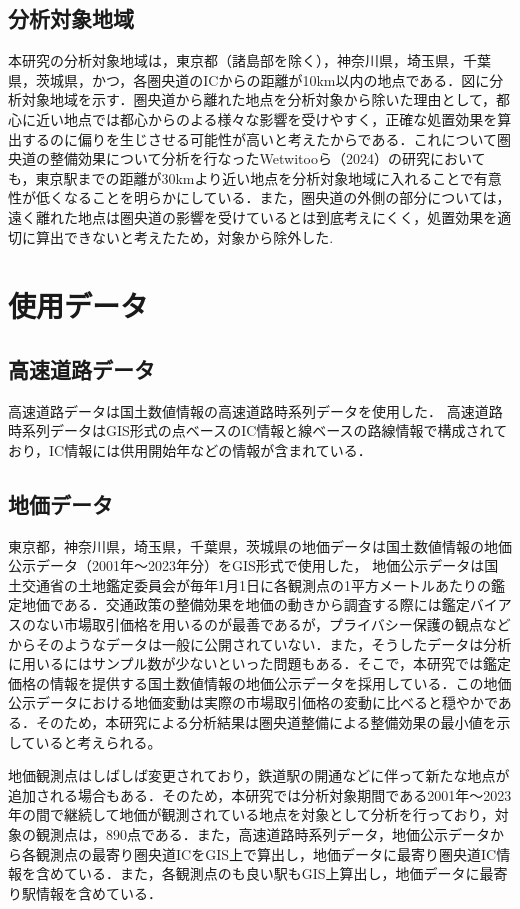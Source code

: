 \subsection{分析対象地域}
本研究の分析対象地域は，東京都（諸島部を除く），神奈川県，埼玉県，千葉県，茨城県，かつ，各圏央道のICからの距離が10km以内の地点である．図に分析対象地域を示す．圏央道から離れた地点を分析対象から除いた理由として，都心に近い地点では都心からのよる様々な影響を受けやすく，正確な処置効果を算出するのに偏りを生じさせる可能性が高いと考えたからである．これについて圏央道の整備効果について分析を行なったWetwitooら（2024）\cite{Weteitoo2024}の研究においても，東京駅までの距離が30kmより近い地点を分析対象地域に入れることで有意性が低くなることを明らかにしている．また，圏央道の外側の部分については，遠く離れた地点は圏央道の影響を受けているとは到底考えにくく，処置効果を適切に算出できないと考えたため，対象から除外した.

\section{使用データ}

\subsection{高速道路データ}
高速道路データは国土数値情報の高速道路時系列データを使用した．
高速道路時系列データはGIS形式の点ベースのIC情報と線ベースの路線情報で構成されており，IC情報には供用開始年などの情報が含まれている．

\subsection{地価データ}
東京都，神奈川県，埼玉県，千葉県，茨城県の地価データは国土数値情報の地価公示データ（2001年〜2023年分）をGIS形式で使用した，
地価公示データは国土交通省の土地鑑定委員会が毎年1月1日に各観測点の1平方メートルあたりの鑑定地価である．交通政策の整備効果を地価の動きから調査する際には鑑定バイアスのない市場取引価格を用いるのが最善であるが，プライバシー保護の観点などからそのようなデータは一般に公開されていない．また，そうしたデータは分析に用いるにはサンプル数が少ないといった問題もある．そこで，本研究では鑑定価格の情報を提供する国土数値情報の地価公示データを採用している．\cite{shimizu2006}\cite{kunimi2021}この地価公示データにおける地価変動は実際の市場取引価格の変動に比べると穏やかである．そのため，本研究による分析結果は圏央道整備による整備効果の最小値を示していると考えられる。

地価観測点はしばしば変更されており，鉄道駅の開通などに伴って新たな地点が追加される場合もある．そのため，本研究では分析対象期間である2001年～2023年の間で継続して地価が観測されている地点を対象として分析を行っており，対象の観測点は，890点である．また，高速道路時系列データ，地価公示データから各観測点の最寄り圏央道ICをGIS上で算出し，地価データに最寄り圏央道IC情報を含めている．また，各観測点のも良い駅もGIS上算出し，地価データに最寄り駅情報を含めている．

